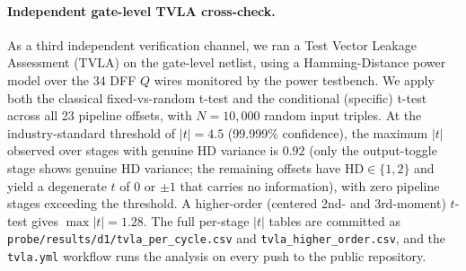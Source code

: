 \documentclass[lettersize,journal]{IEEEtran}
\begin{document}
\paragraph{Independent gate-level TVLA cross-check.}
As a third independent verification channel, we ran a Test Vector
Leakage Assessment (TVLA) on the gate-level netlist, using a
Hamming-Distance power model over the 34 DFF $Q$ wires
monitored by the power testbench.  We apply both the
classical fixed-vs-random t-test and the conditional (specific)
t-test across all 23 pipeline offsets, with $N{=}10{,}000$ random
input triples.  At the industry-standard threshold of
$|t|{=}4.5$ (99.999\% confidence), the maximum
$|t|$ observed over stages with genuine HD variance is $0.92$
(only the output-toggle stage shows genuine HD variance; the
remaining offsets have $\mathrm{HD}\in\{1,2\}$ and yield a
degenerate $t$ of $0$ or $\pm1$ that carries no information), with
zero pipeline stages exceeding the threshold.  A
higher-order (centered 2nd- and 3rd-moment) $t$-test gives
$\max|t|=1.28$.  The full per-stage
$|t|$ tables are
committed as \texttt{probe/results/d1/tvla\_per\_cycle.csv} and
\texttt{tvla\_higher\_order.csv}, and the
\texttt{tvla.yml} workflow runs the analysis on every push to
the public repository.

\begin{table}[t]
\centering
\caption{Robust $d$-probing verification on the gate-level netlist
($N{=}10{,}000$ random input triples, 256 distinct secret values,
34 monitored DFF $Q$ wires, 23 pipeline offsets).
``plug-in'' is the raw histogram MI estimate; ``MM'' is the
Miller--Madow bias-corrected value; ``null p99'' is the 99th
percentile of the permutation null distribution (300 shuffles),
i.e., the bias floor of the estimator at this sample size.  For
this work's 2-wire column we exclude the output-share recombination
pairs $y_0[i]{\times}y_1[i]$ at the output-hold offsets 18--22,
where $y_0 \oplus y_1 = \mathrm{Sbox}(S)$ yields a structural
$\approx 1.02$~bits by construction (see text).  The
last row is the unmasked positive control (same stimulus and
analysis): its single-wire maximum sits $43\times$ above the null,
demonstrating detection power.}
\label{tab:probing}
\end{table}
\end{document}
